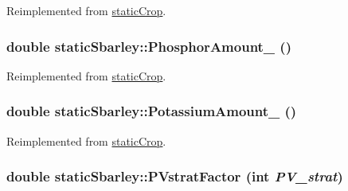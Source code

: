 Reimplemented from \hyperlink{classstatic_crop_ae7d21ab4afc8d8355d231566e8d87b1b}{staticCrop}.\hypertarget{classstatic_sbarley_af16a33276428ac2eae69040b31af01a2}{
\subsubsection[{PhosphorAmount\_\-}]{\setlength{\rightskip}{0pt plus 5cm}double staticSbarley::PhosphorAmount\_\- ()}}
\label{classstatic_sbarley_af16a33276428ac2eae69040b31af01a2}


Reimplemented from \hyperlink{classstatic_crop_abaa5c59d4074d47dedc79172f8326e08}{staticCrop}.\hypertarget{classstatic_sbarley_a90c55ed5dad4e783985c2f7bdbcba872}{
\subsubsection[{PotassiumAmount\_\-}]{\setlength{\rightskip}{0pt plus 5cm}double staticSbarley::PotassiumAmount\_\- ()}}
\label{classstatic_sbarley_a90c55ed5dad4e783985c2f7bdbcba872}


Reimplemented from \hyperlink{classstatic_crop_a41fee98d728c7670e6acb504a9b3459d}{staticCrop}.\hypertarget{classstatic_sbarley_ab3d8d74e997acbb7ef86b2edd96deaba}{
\subsubsection[{PVstratFactor}]{\setlength{\rightskip}{0pt plus 5cm}double staticSbarley::PVstratFactor (int {\em PV\_\-strat})}}
\label{classstatic_sbarley_ab3d8d74e997acbb7ef86b2edd96deaba}


